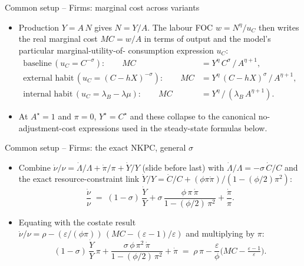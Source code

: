 \documentclass[11pt,aspectratio=169]{beamer}
\begin{document}
\begin{frame}{Common setup -- Firms: marginal cost across variants}

\begin{itemize}

\item Production $Y = A\,N$ gives $N = Y/A$. The labour FOC
  $w = N^\eta / u_C$ then writes the real marginal cost $MC = w/A$
  in terms of output and the model's particular marginal-utility-of-
  consumption expression $u_C$:
  \begin{align*}
  \text{baseline}\,(u_C = C^{-\sigma}): \qquad MC &= Y^\eta\,C^\sigma\,/\,A^{\eta+1}, \\
  \text{external habit}\,(u_C = (C-hX)^{-\sigma}): \qquad MC &= Y^\eta\,(C - h X)^\sigma\,/\,A^{\eta+1}, \\
  \text{internal habit}\,(u_C = \lambda_B - \lambda\mu): \qquad MC &= Y^\eta\,/\,(\lambda_B\,A^{\eta+1}).
  \end{align*}

\item At $A^\star = 1$ and $\pi=0$, $Y^\star = C^\star$ and these collapse to the
  canonical no-adjustment-cost expressions used in the steady-state
  formulas below.

\end{itemize}

\end{frame}

\begin{frame}{Common setup -- Firms: the exact NKPC, general $\sigma$}

\begin{itemize}

\item Combine $\dot\nu/\nu = \dot\Lambda/\Lambda + \dot\pi/\pi + \dot Y/Y$
  (slide before last) with $\dot\Lambda/\Lambda = -\sigma\,\dot C/C$ and
  the exact resource-constraint link
  $\dot Y/Y = \dot C/C + (\phi\pi\dot\pi)/(1-(\phi/2)\pi^2)$:
  \[
  \frac{\dot\nu}{\nu}
  \;=\; (1-\sigma)\,\frac{\dot Y}{Y}
  + \sigma\,\frac{\phi\,\pi\,\dot\pi}{1 - (\phi/2)\,\pi^2}
  + \frac{\dot\pi}{\pi}.
  \]

\item Equating with the costate result $\dot\nu/\nu = \rho - (\varepsilon/(\phi\pi))\,(MC - (\varepsilon-1)/\varepsilon)$ and multiplying by $\pi$:
  \[
  (1-\sigma)\,\frac{\dot Y}{Y}\,\pi
  + \frac{\sigma\,\phi\,\pi^2\,\dot\pi}{1 - (\phi/2)\,\pi^2}
  + \dot\pi
  \;=\; \rho\,\pi - \frac{\varepsilon}{\phi}\Big(MC - \tfrac{\varepsilon-1}{\varepsilon}\Big).
  \]


\end{itemize}

\end{frame}
\end{document}
